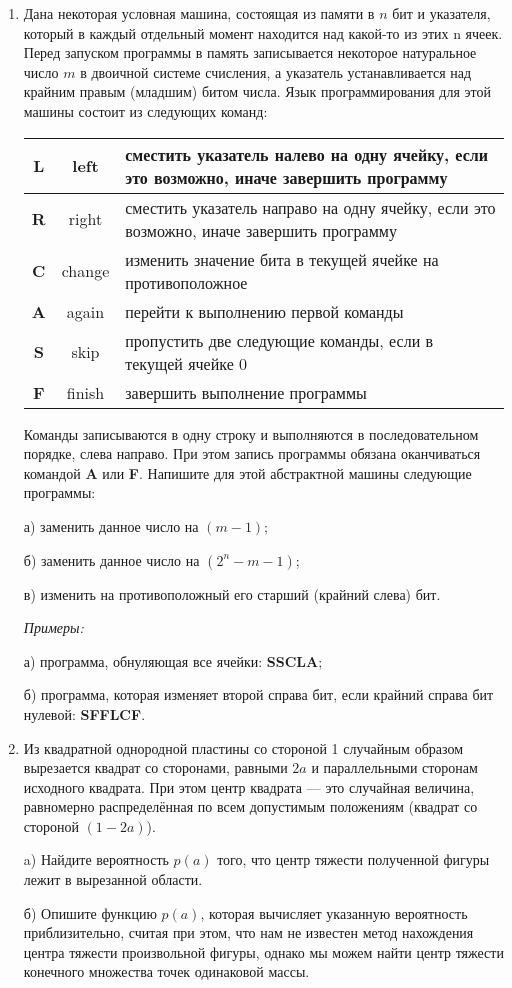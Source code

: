 \begin{enumerate}
\item  Дана некоторая условная машина, состоящая из памяти в $n$ бит и указателя, который в каждый отдельный момент находится над какой-то из этих n ячеек. Перед запуском программы в память записывается некоторое натуральное число $m$ в двоичной системе счисления, а указатель устанавливается над крайним правым (младшим) битом числа. Язык программирования для этой машины состоит из следующих команд:

\begin{center}
\begin{tabular}{|c|c|p{}|}
\hline
{\bf L} & left & сместить указатель налево на одну ячейку, если это возможно, иначе завершить программу\\
\hline
{\bf R} & right & сместить указатель направо на одну ячейку, если это возможно, иначе завершить программу\\
\hline
{\bf C} & change & изменить значение бита в текущей ячейке на противоположное\\
\hline
{\bf A} & again & перейти к выполнению первой команды\\
\hline
{\bf S} & skip & пропустить две следующие команды, если в текущей ячейке 0\\
\hline
{\bf F} & finish & завершить выполнение программы\\
\hline
\end{tabular}
\end{center}

Команды записываются в одну строку и выполняются в последовательном порядке, слева направо. При этом запись программы обязана оканчиваться командой \textbf{A} или \textbf{F}. Напишите для этой абстрактной машины следующие программы:

а) заменить данное число на $(m - 1)$;

б) заменить данное число на $(2^n - m - 1)$;

в) изменить на противоположный его старший (крайний слева) бит.

\textit{Примеры:}

а) программа, обнуляющая все ячейки: \textbf{SSCLA};

б) программа, которая изменяет второй справа бит, если крайний справа бит нулевой: \textbf{SFFLCF}.


\item Из квадратной однородной пластины со стороной 1 случайным образом вырезается квадрат со сторонами, равными $2a$ и параллельными сторонам исходного квадрата. При этом центр квадрата --- это случайная величина, равномерно распределённая по всем допустимым положениям (квадрат со стороной $(1 - 2a)$).

a) Найдите вероятность $p(a)$ того, что центр тяжести полученной фигуры лежит в вырезанной области.

б) Опишите функцию $p(a)$, которая вычисляет указанную вероятность приблизительно, считая при этом, что нам не известен метод нахождения центра тяжести произвольной фигуры, однако мы можем найти центр тяжести конечного множества точек одинаковой массы.

\end{enumerate}
